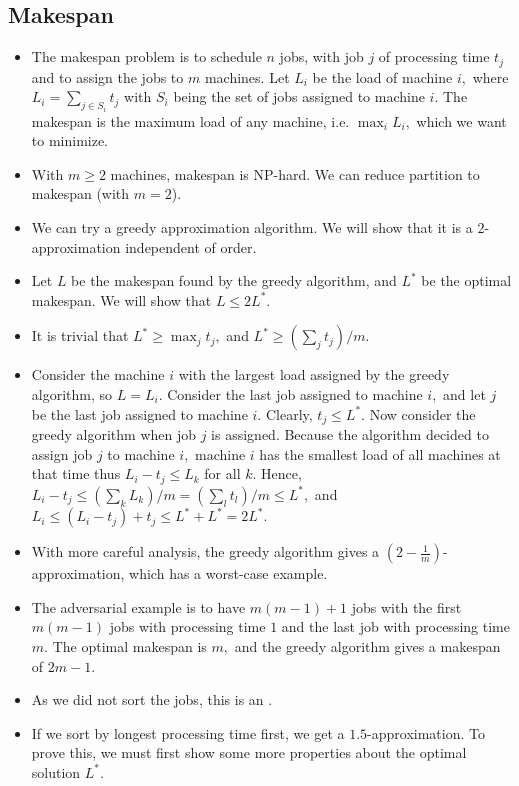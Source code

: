 \documentclass[a4paper,12pt]{article}
\begin{document}
\subsection{Makespan}
\begin{itemize}
    \item The makespan problem is to schedule $n$ jobs, with job $j$ of processing time $t_j$ and to assign the jobs to $m$ machines. Let $L_i$ be the load of machine $i,$ where $L_i=\sum_{j\in S_i}t_j$ with $S_i$ being the set of jobs assigned to machine $i.$ The makespan is the maximum load of any machine, i.e. $\max_iL_i,$ which we want to minimize. 
    \item With $m\geq 2$ machines, makespan is NP-hard. We can reduce partition to makespan (with $m=2$).
    \item We can try a greedy approximation algorithm. We will show that it is a $2$-approximation independent of order.
    \item Let $L$ be the makespan found by the greedy algorithm, and $L^*$ be the optimal makespan. We will show that $L\leq 2L^*.$
    \item It is trivial that $L^*\geq \max_jt_j,$ and $L^*\geq\left(\sum_jt_j\right)/m.$
    \item Consider the machine $i$ with the largest load assigned by the greedy algorithm, so $L=L_i.$ Consider the last job assigned to machine $i,$ and let $j$ be the last job assigned to machine $i.$ Clearly, $t_j\leq L^*.$ Now consider the greedy algorithm when job $j$ is assigned. Because the algorithm decided to assign job $j$ to machine $i,$ machine $i$ has the smallest load of all machines at that time thus $L_i-t_j\leq L_k$ for all $k.$ Hence, $L_i-t_j\leq(\sum_{k}L_k)/m=(\sum_{l}t_l)/m\leq L^*,$ and $L_i\leq (L_i-t_j)+t_j\leq L^*+L^*=2L^*.$
    \item With more careful analysis, the greedy algorithm gives a $\left(2-\frac{1}{m}\right)$-approximation, which has a worst-case example.
    \item The adversarial example is to have $m(m-1)+1$ jobs with the first $m(m-1)$ jobs with processing time $1$ and the last job with processing time $m.$ The optimal makespan is $m,$ and the greedy algorithm gives a makespan of $2m-1.$
    \item As we did not sort the jobs, this is an .
    \item If we sort by longest processing time first, we get a $1.5$-approximation. To prove this, we must first show some more properties about the optimal solution $L^*.$

\end{itemize}
\end{document}
